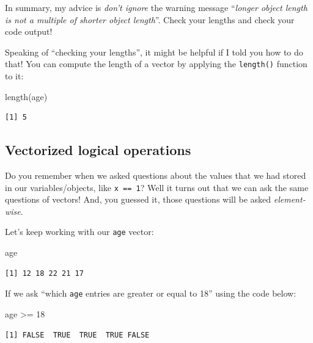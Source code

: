 \documentclass[
  letterpaper,
  DIV=11,
  numbers=noendperiod]{scrreprt}
\newenvironment{Shaded}{\begin{snugshade}}{\end{snugshade}}
\newcommand{\DecValTok}[1]{\textcolor[rgb]{0.68,0.00,0.00}{#1}}
\newcommand{\FunctionTok}[1]{\textcolor[rgb]{0.28,0.35,0.67}{#1}}
\newcommand{\NormalTok}[1]{\textcolor[rgb]{0.00,0.23,0.31}{#1}}
\newcommand{\SpecialCharTok}[1]{\textcolor[rgb]{0.37,0.37,0.37}{#1}}
\begin{document}
In summary, my advice is \emph{don't ignore} the warning message
``\emph{longer object length is not a multiple of shorter object
length}''. Check your lengths and check your code output!

Speaking of ``checking your lengths'', it might be helpful if I told you
how to do that! You can compute the length of a vector by applying the
\texttt{length()} function to it:

\begin{Shaded}
\begin{Highlighting}[]
\FunctionTok{length}\NormalTok{(age)}
\end{Highlighting}
\end{Shaded}

\begin{verbatim}
[1] 5
\end{verbatim}

\subsection{Vectorized logical
operations}\label{vectorized-logical-operations}

Do you remember when we asked questions about the values that we had
stored in our variables/objects, like \texttt{x\ ==\ 1}? Well it turns
out that we can ask the same questions of vectors! And, you guessed it,
those questions will be asked \emph{element-wise}.

Let's keep working with our \texttt{age} vector:

\begin{Shaded}
\begin{Highlighting}[]
\NormalTok{age}
\end{Highlighting}
\end{Shaded}

\begin{verbatim}
[1] 12 18 22 21 17
\end{verbatim}

If we ask ``which \texttt{age} entries are greater or equal to 18''
using the code below:

\begin{Shaded}
\begin{Highlighting}[]
\NormalTok{age }\SpecialCharTok{\textgreater{}=} \DecValTok{18}
\end{Highlighting}
\end{Shaded}

\begin{verbatim}
[1] FALSE  TRUE  TRUE  TRUE FALSE
\end{verbatim}
\end{document}
